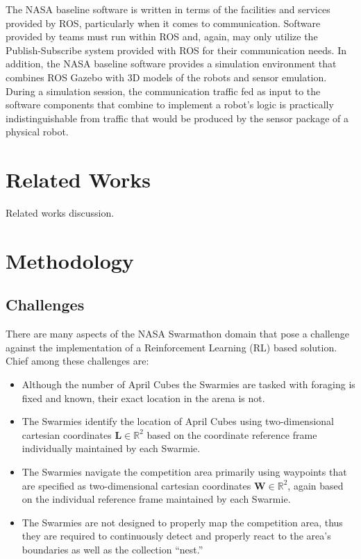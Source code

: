 \documentclass[sigconf,authordraft]{acmart}
\begin{document}
The NASA baseline software is written in terms of the facilities and services
provided by ROS, particularly when it comes to communication. Software provided
by teams must run within ROS and, again, may only utilize the Publish-Subscribe
system provided with ROS for their communication needs. In addition, the NASA
baseline software provides a simulation environment that combines ROS Gazebo
with 3D models of the robots and sensor emulation. During a simulation session,
the communication traffic fed as input to the software components that combine
to implement a robot's logic is practically indistinguishable from traffic that
would be produced by the sensor package of a physical robot.

\section{Related Works}\label{sec:related_works}
Related works discussion.

\section{Methodology}\label{sec:methodology}

\subsection{Challenges}\label{subsec:challenges}
There are many aspects of the NASA Swarmathon domain that pose a challenge against the implementation of a Reinforcement Learning (RL) based solution. Chief among these challenges are:

\begin{itemize}
  \item Although the number of April Cubes the Swarmies are tasked with foraging is fixed and known, their exact location in the arena is not.
  \item The Swarmies identify the location of April Cubes using two-dimensional cartesian coordinates $\textbf{L} \in \mathbb{R}^2$ based on the coordinate reference frame individually maintained by each Swarmie.
  \item The Swarmies navigate the competition area primarily using waypoints that are specified as two-dimensional cartesian coordinates $\textbf{W} \in \mathbb{R}^2$, again based on the individual reference frame maintained by each Swarmie.
  \item The Swarmies are not designed to properly map the competition area, thus they are required to continuously detect and properly react to the area's boundaries as well as the collection ``nest.''
\end{itemize}
\end{document}
